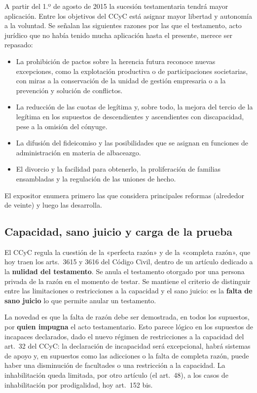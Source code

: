 \documentclass[12pt,oneside]{book}
\begin{document}
A partir del 1.º de agosto de 2015 la sucesión testamentaria tendrá mayor aplicación. Entre los objetivos del CCyC está asignar mayor libertad y autonomía a la voluntad. Se señalan las siguientes razones por las que el testamento, acto jurídico que no había tenido mucha aplicación hasta el presente, merece ser repasado:

\begin{itemize}
    \item La prohibición de pactos sobre la herencia futura reconoce nuevas excepciones, como la explotación productiva o de participaciones societarias, con miras a la conservación de la unidad de gestión empresaria o a la prevención y solución de conflictos.
    \item La reducción de las cuotas de legítima y, sobre todo, la mejora del tercio de la legítima en los supuestos de descendientes y ascendientes con discapacidad, pese a la omisión del cónyuge.
    \item La difusión del fideicomiso y las posibilidades que se asignan en funciones de administración en materia de albaceazgo.
    \item El divorcio y la facilidad para obtenerlo, la proliferación de familias ensambladas y la regulación de las uniones de hecho.
\end{itemize}

El expositor enumera primero las que considera principales reformas (alrededor de veinte) y luego las desarrolla.

\subsection{Capacidad, sano juicio y carga de la prueba}

El CCyC regula la cuestión de la «perfecta razón» y de la «completa razón», que hoy traen los arts.~3615 y 3616 del Código Civil, dentro de un artículo dedicado a la \textbf{nulidad del testamento}. Se anula el testamento otorgado por una persona privada de la razón en el momento de testar. Se mantiene el criterio de distinguir entre las limitaciones o restricciones a la capacidad y el sano juicio: es la \textbf{falta de sano juicio} lo que permite anular un testamento.

La novedad es que la falta de razón debe ser demostrada, en todos los supuestos, por \textbf{quien impugna} el acto testamentario. Esto parece lógico en los supuestos de incapaces declarados, dado el nuevo régimen de restricciones a la capacidad del art.~32 del CCyC: la declaración de incapacidad será excepcional, habrá sistemas de apoyo y, en supuestos como las adicciones o la falta de completa razón, puede haber una disminución de facultades o una restricción a la capacidad. La inhabilitación queda limitada, por otro artículo (el art.~48), a los casos de inhabilitación por prodigalidad, hoy art.~152 bis.
\end{document}
